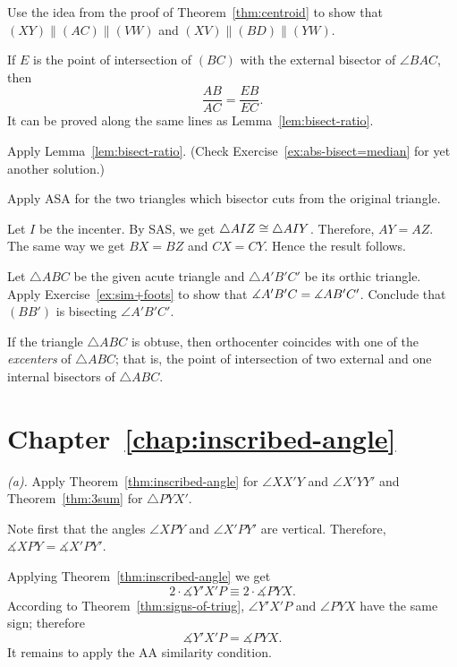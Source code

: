 Use the idea from the proof of Theorem~\ref{thm:centroid}
to show that $(XY)\parallel (AC)\parallel (VW)$ and
$(XV)\parallel (BD)\parallel (YW)$.


If $E$ is the point of intersection of $(BC)$ 
with the external bisector of $\angle BAC$, then 
$$\frac{AB}{AC}=\frac{EB}{EC}.$$
It can be proved along the same lines as Lemma~\ref{lem:bisect-ratio}.

Apply Lemma~\ref{lem:bisect-ratio}.
(Check Exercise~\ref{ex:abs-bisect=median} for yet another solution.)


Apply ASA for the two triangles which bisector cuts from the original triangle. 

Let $I$ be the incenter.
By SAS, we get $\triangle AIZ\z\cong\triangle AIY$. Therefore, $AY=AZ$.
The same way we get $BX=BZ$ and $CX=CY$.
Hence the result follows.

Let $\triangle ABC$ be the given acute triangle and $\triangle A'B'C'$ 
be its orthic triangle.
Apply Exercise~\ref{ex:sim+foots} to show that 
$\measuredangle A'B'C\z=\measuredangle AB'C'$.
Conclude that $(BB')$ is bisecting $\angle A'B'C'$.

If the triangle $\triangle ABC$ is obtuse, then orthocenter coincides with one of the \emph{excenters} of $\triangle ABC$;
that is, 
the point of intersection of two external and one internal bisectors of $\triangle ABC$.
 

 

\section*{Chapter~\ref{chap:inscribed-angle}}
\setcounter{eqtn}{0}

 \textit{(a).}
Apply Theorem~\ref{thm:inscribed-angle} for $\angle XX'Y$ and $\angle X'YY'$
and Theorem~\ref{thm:3sum} for $\triangle PYX'$.

 Note first that the angles $\angle XPY$ and $\angle X'PY'$ are vertical.
Therefore, $\measuredangle XPY=\measuredangle X'PY'$.

Applying Theorem~\ref{thm:inscribed-angle} we get
$$2\cdot \measuredangle Y'X'P\equiv 2\cdot\measuredangle PYX.$$
According to Theorem~\ref{thm:signs-of-triug}, $\angle Y'X'P$ and $\angle PYX$ have the same sign;
therefore
$$\measuredangle Y'X'P= \measuredangle PYX.$$
It remains to apply the AA similarity condition.

